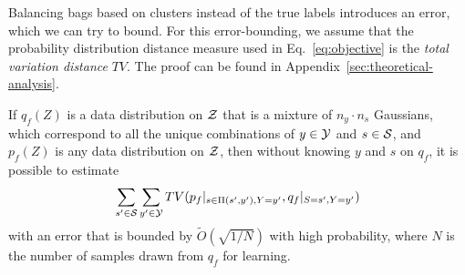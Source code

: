 Balancing bags based on clusters instead of the true labels introduces an error, which we can try
to bound. 
%
For this error-bounding, we assume that the probability distribution distance measure used in
Eq.~\ref{eq:objective} is the \emph{total variation distance} \(TV\). 
%
The proof can be found in Appendix~\ref{sec:theoretical-analysis}.

\begin{theorem}
%
If \(q_f(Z)\) is a data distribution on \({\mathcal{Z}}\) that is a mixture of \(n_y\cdot n_s\) Gaussians,
which correspond to all the unique combinations of \(y\in{\mathcal{Y}}\) and \(s\in{\mathcal{S}}\), and \(p_f(Z)\) is
any data distribution on \({\mathcal{Z}}\), then without knowing \(y\) and \(s\) on \(q_f\), it is possible
to estimate
%
\begin{align}
  \sum\limits_{s^\prime\in{\mathcal{S}}}\sum\limits_{y^\prime\in{\mathcal{Y}}} TV(p_f|_{s\in
  \Pi(s^\prime,y^\prime),Y=y^\prime},
q_f|_{S=s^\prime,Y=y^\prime})
\end{align}
%
with an error that is bounded by \(\tilde{O}(\sqrt{1/N})\) with high
probability, where \(N\) is the number of samples drawn from \(q_f\) for
learning.
%
\end{theorem}

